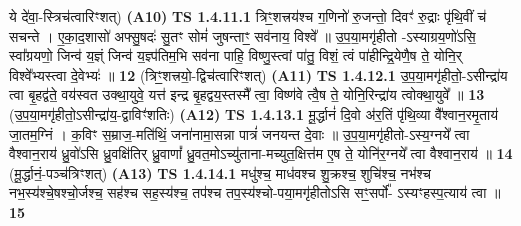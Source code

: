 \documentclass[17pt]{extarticle}
\begin{document}
                      ये दे॑वा॒-स्त्रिच॑त्वारिꣳशत्)  \textbf{(A10)} \newline \newline
                                        \textbf{ TS 1.4.11.1} \newline
                  त्रिꣳ॒॒शत्त्रय॑श्च ग॒णिनो॑ रु॒जन्तो॒ दिवꣳ॑ रु॒द्राः पृ॑थि॒वीं च॑ सचन्ते । ए॒का॒द॒शासो॑ अफ्सु॒षदः॑ सु॒तꣳ सोमं॑ जुषन्ताꣳ॒॒ सव॑नाय॒ विश्वे᳚ ॥ उ॒प॒या॒मगृ॑हीतो -ऽस्याग्रय॒णो॑ऽसि॒ स्वा᳚ग्रयणो॒ जिन्व॑ य॒ज्ञ्ं जिन्व॑ य॒ज्ञ्प॑तिम॒भि सव॑ना पाहि॒ विष्णु॒स्त्वां पा॑तु॒ विशं॒ त्वं पा॑हीन्द्रि॒येणै॒ष ते॒ योनि॒र् विश्वे᳚भ्यस्त्वा दे॒वेभ्यः॑ ॥ \textbf{  12} \newline
                  \newline
                      (त्रिꣳ॒॒शत्त्रयो॒-द्विच॑त्वारिꣳशत्)  \textbf{(A11)} \newline \newline
                                        \textbf{ TS 1.4.12.1} \newline
                  उ॒प॒या॒मगृ॑हीतो॒-ऽसीन्द्रा॑य त्वा बृ॒हद्व॑ते॒ वय॑स्वत उक्था॒युवे॒ यत्त॑ इन्द्र बृ॒हद्वय॒स्तस्मै᳚ त्वा॒ विष्ण॑वे त्वै॒ष ते॒ योनि॒रिन्द्रा॑य त्वोक्था॒युवे᳚ ॥ \textbf{  13} \newline
                  \newline
                      (उ॒प॒या॒मगृ॑हीतो॒ऽसीन्द्रा॑य॒-द्वाविꣳ॑शतिः)  \textbf{(A12)} \newline \newline
                                        \textbf{ TS 1.4.13.1} \newline
                  मू॒र्द्धानं॑ दि॒वो अ॑र॒तिं पृ॑थि॒व्या वै᳚श्वान॒रमृ॒ताय॑ जा॒तम॒ग्निं । क॒विꣳ स॒म्राज॒-मति॑थिं॒ जना॑नामा॒सन्ना पात्रं॑ जनयन्त दे॒वाः ॥ उ॒प॒या॒मगृ॑हीतो-ऽस्य॒ग्नये᳚ त्वा वैश्वान॒राय॑ ध्रु॒वो॑ऽसि ध्रु॒वक्षि॑तिर् ध्रु॒वाणां᳚ ध्रु॒वत॒मोऽच्यु॑ताना-मच्युत॒क्षित्त॑म ए॒ष ते॒ योनि॑र॒ग्नये᳚ त्वा वैश्वान॒राय॑ ॥ \textbf{  14} \newline
                  \newline
                      (मू॒र्द्धानं॒-पञ्च॑त्रिꣳशत्)  \textbf{(A13)} \newline \newline
                                        \textbf{ TS 1.4.14.1} \newline
                  मधु॑श्च॒ माध॑वश्च शु॒क्रश्च॒ शुचि॑श्च॒ नभ॑श्च नभ॒स्य॑श्चे॒षश्चो॒र्जश्च॒ सह॑श्च सह॒स्य॑श्च॒ तप॑श्च तप॒स्य॑श्चो-पया॒मगृ॑हीतोऽसि सꣳ॒॒सर्पो᳚- ऽस्यꣳहस्प॒त्याय॑ त्वा ॥ \textbf{  15 } \newline
\end{document}
